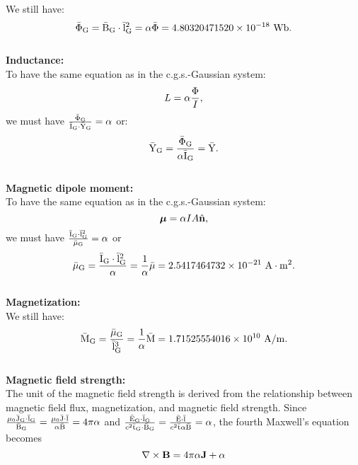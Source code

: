 \documentclass[12pt,a4paper,twoside]{report}
\def\barwbg{4.80320471520\times 10^{-18}}
\def\barmug{2.5417464732\times 10^{-21}}
\def\barmagg{1.71525554016\times 10^{10}}
\begin{document}
{{
We still have:
\begin{equation}
{\rm \bar \Phi_G}={\rm \bar B_G}\cdot {\rm \bar l_G}^2=\alpha \bar \Phi=\barwbg\ {\rm Wb}.
\end{equation}\\
{\bf Inductance:\\}
To have the same equation as in the c.g.s.-Gaussian system:
\begin{equation}
L=\alpha {\Phi \over I},
\end{equation} 
we must have ${{\rm \bar \Phi_G} \over {\rm \bar I_G}\cdot {\rm \bar Y_G}} = \alpha$ or: 
\begin{equation}
{\rm \bar Y_G}={{\rm \bar \Phi_G} \over \alpha {\rm \bar I_G}}={\rm \bar Y}.
\end{equation}\\
{\bf Magnetic dipole moment:\\}
To have the same equation as in the c.g.s.-Gaussian system:
\begin{equation}
{\boldsymbol \mu}=\alpha I A \hat {\bf n},
\label{magdipaucgs}
\end{equation}
we must have ${{\rm \bar I_G}\cdot {\rm \bar l_G}^2 \over {\rm \bar \mu_G}}=\alpha$ or
\begin{equation}
{\rm \bar \mu_G}={{\rm \bar I_G}\cdot {\rm \bar l_G}^2 \over \alpha} ={1 \over \alpha} \bar \mu= 
\barmug\ {\rm A}\cdot {\rm m}^2.
\end{equation}\\
{\bf Magnetization:\\}
We still have:
\begin{equation}
{\rm \bar M_G}={{\rm \bar \mu_G} \over {\rm \bar l_G}^3}={1\over \alpha} {\rm \bar M}=
\barmagg\ {\rm A}/{\rm m}.
\end{equation}\\
{\bf Magnetic field strength:\\}
The unit of the magnetic field strength is derived from the relationship
between magnetic field flux, magnetization, and magnetic field strength.
Since ${\mu_0 {\rm \bar J_G}\cdot {\rm \bar l_G} \over {\rm \bar B_G}}=
{\mu_0 {\rm \bar J}\cdot {\rm \bar l} \over \alpha {\rm \bar B}}=4\pi \alpha$ and
${{\rm \bar E_G}\cdot {\rm \bar l_G} \over c^2 {\rm \bar t_G}\cdot {\rm \bar B_G}}=
{{\rm \bar E}\cdot {\rm \bar l} \over c^2 {\rm \bar t} \alpha {\rm \bar B}}=\alpha$, 
the fourth Maxwell's equation becomes
\begin{equation}
\nabla \times {\bf B}= 4 \pi \alpha {\bf J} + \alpha

\end{equation}}}
\end{document}
